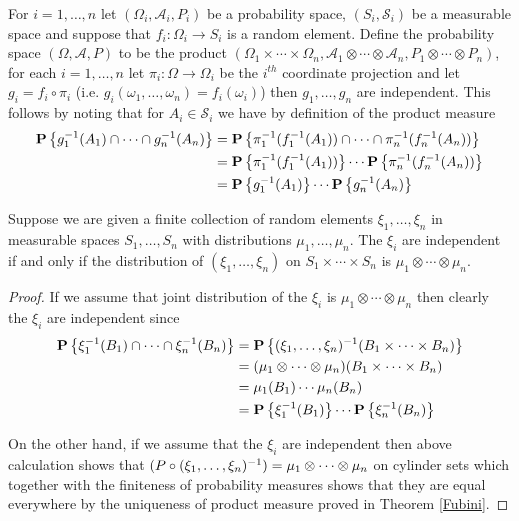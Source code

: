 \begin{examp}\label{IndependenceOnProductSpaces}For $i=1, \dotsc, n$ let $(\Omega_i, \mathcal{A}_i, P_i)$
  be a probability space, $(S_i, \mathcal{S}_i)$ be a measurable space and suppose that $f_i : \Omega_i \to S_i$ is
a random element.  Define the probability space $(\Omega,
  \mathcal{A}, P)$ to be the product $(\Omega_1 \times \dotsb \times \Omega_n,
  \mathcal{A}_1 \otimes \dotsb \otimes \mathcal{A}_n, P_1 \otimes
  \dotsb \otimes P_n)$, for each $i=1, \dotsc, n$ let $\pi_i : \Omega \to \Omega_i$ be the
$i^{th}$ coordinate projection and let $g_i = f_i \circ \pi_i$ (i.e. $g_i(\omega_1, \dotsc, \omega_n) = f_i(\omega_i)$) then
$g_1, \dotsc, g_n$ are independent.  This follows by noting that for $A_i \in \mathcal{S}_i$ we have by definition of the 
product measure
\begin{align*}
\probability{g_1^{-1} (A_1) \cap \dotsb \cap g_n^{-1} (A_n)} &= \probability{\pi_1^{-1}(f_1^{-1} (A_1)) \cap \dotsb \cap \pi_n^{-1}(f_n^{-1} (A_n))} \\
&= \probability{\pi_1^{-1}(f_1^{-1} (A_1))} \dotsb \probability{\pi_n^{-1}(f_n^{-1} (A_n))} \\
&= \probability{g_1^{-1} (A_1)} \dotsb \probability{g_n^{-1} (A_n)} 
\end{align*}
\end{examp}

\begin{lem}\label{IndependenceProductMeasures}Suppose we are given a finite collection of
  random elements $\xi_1, \dots, \xi_n$ in measurable spaces
  $S_1, \dots, S_n$ with distributions $\mu_1, \dots, \mu_n$.  The
  $\xi_i$ are independent if and only if the distribution of $(\xi_1,
  \dots, \xi_n)$ on $S_1 \times \cdots \times S_n$ is $\mu_1 \otimes
  \cdots \otimes \mu_n$.
\end{lem}
\begin{proof}If we assume that joint distribution of the $\xi_i$ is $\mu_1 \otimes
  \cdots \otimes \mu_n$ then clearly the $\xi_i$ are independent since 
\begin{align*}
\probability{\xi_1^{-1}(B_1) \cap \cdots \cap \xi_n^{-1}(B_n)} &=
\probability{(\xi_1, \dots, \xi_n)^{-1}(B_1 \times \cdots \times B_n)}
  \\
&= (\mu_1 \otimes \cdots \otimes \mu_n)(B_1 \times \cdots \times B_n) \\
&= \mu_1(B_1) \cdots \mu_n(B_n) \\
&=\probability{\xi_1^{-1}(B_1)} \cdots \probability{\xi_n^{-1}(B_n)}
\end{align*}

On the other hand, if we assume that the $\xi_i$ are independent then
above calculation shows that $(\pushforward{(\xi_1, \dots, \xi_n)}{P}) =
\mu_1 \otimes \cdots \otimes \mu_n$ on cylinder sets which together
with the finiteness of probability measures shows that
they are equal everywhere by the uniqueness of product measure proved
in Theorem \ref{Fubini}.
\end{proof}

